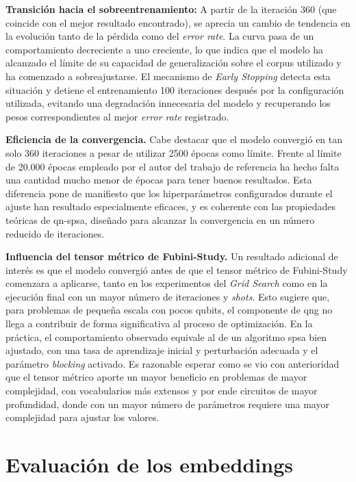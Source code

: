 \textbf{Transición hacia el sobreentrenamiento:} A partir de la iteración 360 (que coincide con el mejor resultado encontrado), se aprecia un cambio de tendencia en la evolución tanto de la pérdida como del \textit{error rate}. La curva pasa de un comportamiento decreciente a uno creciente, lo que indica que el modelo ha alcanzado el límite de su capacidad de generalización sobre el corpus utilizado y ha comenzado a sobreajustarse. El mecanismo de \textit{Early Stopping} detecta esta situación y detiene el entrenamiento 100 iteraciones después por la configuración utilizada, evitando una degradación innecesaria del modelo y recuperando los pesos correspondientes al mejor \textit{error rate} registrado.

\textbf{Eficiencia de la convergencia.} Cabe destacar que el modelo convergió en tan solo 360 iteraciones a pesar de utilizar 2500 épocas como límite. Frente al límite de 20.000 épocas empleado por el autor del trabajo de referencia \cite{ohno_qword2vec_2025} ha hecho falta una cantidad mucho menor de épocas para tener buenos resultados. Esta diferencia pone de manifiesto que los hiperparámetros configurados durante el ajuste han resultado especialmente eficaces, y es coherente con las propiedades teóricas de \gls{qn-spsa}, diseñado para alcanzar la convergencia en un número reducido de iteraciones.

\textbf{Influencia del tensor métrico de Fubini-Study.} Un resultado adicional de interés es que el modelo convergió antes de que el tensor métrico de Fubini-Study comenzara a aplicarse, tanto en los experimentos del \textit{Grid Search} como en la ejecución final con un mayor número de iteraciones y \textit{shots}. Esto sugiere que, para problemas de pequeña escala con pocos qubits, el componente de \gls{qng} no llega a contribuir de forma significativa al proceso de optimización. En la práctica, el comportamiento observado equivale al de un algoritmo \gls{spsa} bien ajustado, con una tasa de aprendizaje inicial y perturbación adecuada y el parámetro \textit{blocking} activado. Es razonable esperar como se vio con anterioridad que el tensor métrico aporte un mayor beneficio en problemas de mayor complejidad, con vocabularios más extensos y por ende circuitos de mayor profundidad, donde con un mayor número de parámetros requiere una mayor complejidad para ajustar los valores.


\section{Evaluación de los embeddings}

